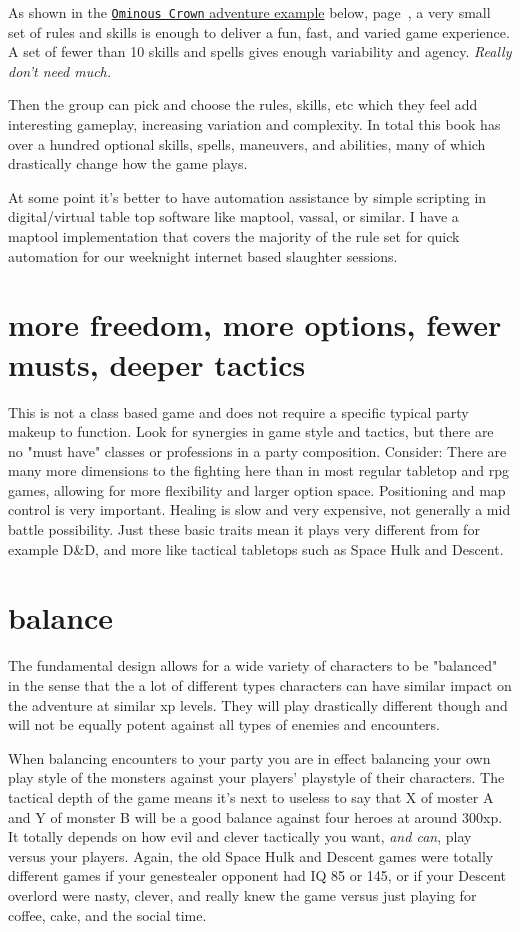As shown in the \hyperref[sec:basicenough]{\texttt{Ominous Crown} adventure example} below, page~\pageref{sec:basicenough}, a very small set of rules and skills is enough to deliver a fun, fast, and varied game experience. A set of fewer than 10 skills and spells gives enough variability and agency. \emph{Really don't need much.}

Then the group can pick and choose the rules, skills, etc which they feel add interesting gameplay, increasing variation and complexity. In total this book has over a hundred optional skills, spells, maneuvers, and abilities, many of which drastically change how the game plays.

At some point it's better to have automation assistance by simple scripting in digital/virtual table top software like maptool, vassal, or similar. I have a maptool implementation that covers the majority of the rule set for quick automation for our weeknight internet based slaughter sessions.


\section*{more freedom, more options, fewer musts, deeper tactics}
This is not a class based game and does not require a specific typical party makeup to function. Look for synergies in game style and tactics, but there are no "must have" classes or professions in a party composition. Consider: There are many more dimensions to the fighting here than in most regular tabletop and rpg games, allowing for more flexibility and larger option space. Positioning and map control is very important. Healing is slow and very expensive, not generally a mid battle possibility. Just these basic traits mean it plays very different from for example D\&D, and more like tactical tabletops such as Space Hulk and Descent.


\section*{balance}
The fundamental design allows for a wide variety of characters to be "balanced" in the sense that the a lot of different types characters can have similar impact on the adventure at similar xp levels. They will play drastically different though and will not be equally potent against all types of enemies and encounters.

When balancing encounters to your party you are in effect balancing your own play style of the monsters against your players' playstyle of their characters. The tactical depth of the game means it's next to useless to say that X of moster A and Y of monster B will be a good balance against four heroes at around 300xp. It totally depends on how evil and clever tactically you want, \emph{and can}, play versus your players. Again, the old Space Hulk and Descent games were totally different games if your genestealer opponent had IQ 85 or 145, or if your Descent overlord were nasty, clever, and really knew the game versus just playing for coffee, cake, and the social time.

